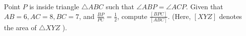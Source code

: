 Point $P$ is inside triangle $\triangle A B C$ such that $\angle A B P=\angle A C P$. Given that $A B=6, A C=8, B C=7$, and $\frac{B P}{P C}=\frac{1}{2}$, compute $\frac{[B P C]}{[A B C]}$.
(Here, $[X Y Z]$ denotes the area of $\triangle X Y Z$ ).
